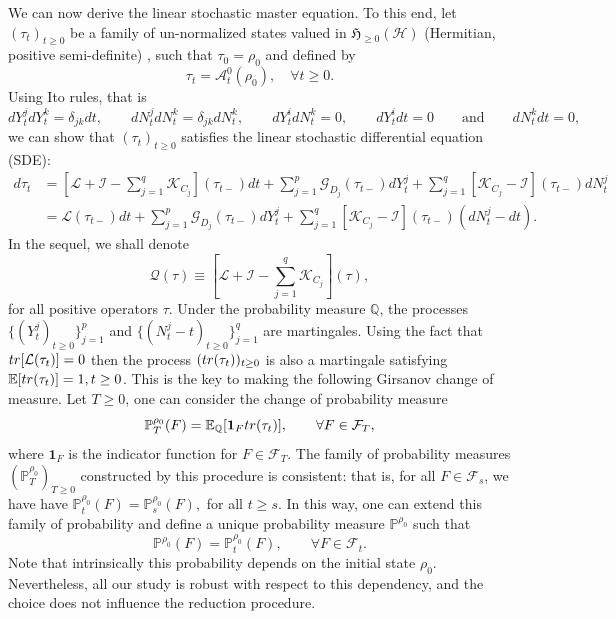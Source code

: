 \documentclass[aihp,12pt]{imsart}
\newcommand{\Gc}{\mathcal{G}}
\newcommand{\Hc}{\mathcal{H}}
\newcommand{\Qc}{\mathcal{Q}}
\newcommand{\Ic}{\mathcal{I}}
\newcommand{\Kc}{\mathcal{K}}
\newcommand{\Lc}{\mathcal{L}}
\newcommand{\Pb}{\mathbb{P}}
\newcommand{\Hf}{\mathfrak{H}}
\newcommand{\tr}{{\rm tr}}
\theoremstyle{theorem}
\theoremstyle{definition}
\theoremstyle{remark}
\begin{document}
We can now derive the linear stochastic master equation. To this end, let $(\tau_t)_{t\geq0}$ be a family of un-normalized states valued in $\Hf_{\geq0}(\Hc)$ (Hermitian, positive semi-definite) , such that $\tau_0=\rho_0$ and defined by
$$\tau_t=\mathcal A_t^0(\rho_0),\quad \forall t\geq0.$$ Using Ito rules, that is \[dY_t^jdY_t^k=\delta_{jk}dt,\qquad dN_t^jdN_t^k=\delta_{jk}dN_t^k,\qquad dY_t^idN_t^k=0,\qquad dY_t^idt=0\qquad\text{and}\qquad dN_t^kdt=0,\] we can show that $(\tau_t)_{t\geq0}$ satisfies the linear stochastic differential equation (SDE): 
\begin{equation}
\begin{split}
    d\tau_t &= \left[\Lc +\Ic - \sum_{j=1}^q \Kc_{C_j} \right](\tau_{t-}) dt + \sum_{j=1}^{p}\Gc_{D_j}(\tau_{t-}) dY_t^j +\sum_{j=1}^q \left[\Kc_{C_j}-\Ic\right](\tau_{t-}) dN_t^j\\
    &=\Lc (\tau_{t-}) dt + \sum_{j=1}^{p}\Gc_{D_j}(\tau_{t-}) dY_t^j +\sum_{j=1}^q \left[\Kc_{C_j}-\Ic\right](\tau_{t-}) (dN_t^j-dt).
\end{split}
    \label{eq:Belavkin-Zakai}
\end{equation}
In the sequel, we shall denote 
\begin{equation}
    \Qc(\tau) \equiv \left[\Lc +\Ic - \sum_{j=1}^q \Kc_{C_j} \right](\tau),
\end{equation}
for all positive operators $\tau$. Under the probability measure $\mathbb Q$, the processes $\{(Y_t^j)_{t\geq0}\}_{j=1}^p$ and $\{(N_t^j-t)_{t\geq0}\}_{j=1}^q$ are martingales. Using the fact that $\tr[\Lc(\tau_t)]=0$ then the process $(\tr(\tau_t))_{t\geq0}$ is also a martingale satisfying $\mathbb E[\tr(\tau_t)]=1, t\geq0$. This is the key to making the following Girsanov change of measure. Let $T\geq0$, one can consider the change of probability measure
$$\Pb^{\rho_0}_T(F)=\mathbb E_{\mathbb Q}[\mathbf 1_F\tr(\tau_t)], \qquad \forall F\in\mathcal F_T,$$
where $\mathbf 1_F$ is the indicator function for $F\in\mathcal F_T$.
The family of probability measures $(\Pb^{\rho_0}_T)_{T\geq 0}$ constructed by this procedure is consistent: that is, for all $F\in\mathcal F_s$, we have have $\Pb^{\rho_0}_t(F)=\Pb^{\rho_0}_s(F),$  for all $t\geq s$. In this way, one can extend this family of probability and define a unique probability measure $\Pb^{\rho_0}$ such that  $$\Pb^{\rho_0}(F)=\Pb^{\rho_0}_t(F),\qquad\forall F\in\mathcal F_t.$$  Note that intrinsically this probability depends on the initial state $\rho_0$. Nevertheless, all our study is robust with respect to this dependency, and the choice does not influence the reduction procedure.  
\end{document}
